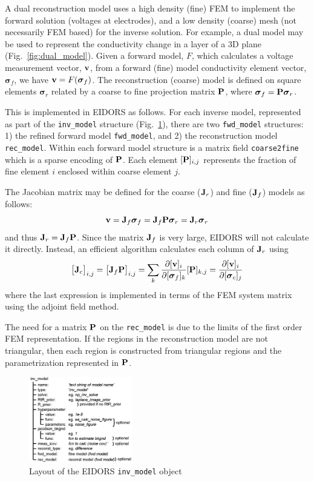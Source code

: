 \documentclass[letterpaper,twocolumn,10pt]{article}
\newcommand{\vB}{\mbox{$\bf v$}}
\newcommand{\JB}{\mbox{$\bf J$}}
\newcommand{\PB}{\mbox{$\bf P$}}
\newcommand{\sG}{\mbox{$\boldsymbol \sigma$}}
\begin{document}
A dual reconstruction model uses a high density (fine)
FEM to implement the forward solution (voltages
at electrodes), and a low density (coarse) mesh
(not necessarily FEM based) for the inverse
solution. For example, a dual model may be used to 
represent the conductivity change in a layer
of a 3D plane (Fig.~\ref{fig:dual_model}).
Given a forward model, $F$,
which calculates a voltage measurement vector, $\vB$, from
a forward (fine) model conductivity element vector, $\sG_f$, we
have $\vB = F( \sG_f )$. The reconstruction (coarse)
model is defined on square elements $\sG_r$ related by
a coarse to fine projection matrix $\PB$, where $\sG_f = \PB \sG_r$.

This is implemented in EIDORS as follows. For each
inverse model, represented as part of the {\tt inv\_model}
structure (Fig.~\ref{fig:invmdl}),
there are two {\tt fwd\_model} structures:
1) the refined forward model {\tt fwd\_model}, and
2) the reconstruction model {\tt rec\_model}. 
Within each forward model structure is a matrix field
{\tt coarse2fine} which is a sparse encoding of $\PB$.
Each element $[\PB]_{i,j}$ represents the fraction of
fine element $i$ enclosed within coarse element $j$.

The Jacobian matrix may be defined for the coarse
($\JB_r$) and fine ($\JB_f$) models as follows:
\begin{equation}
\vB = \JB_f \sG_f 
    = \JB_f \PB \sG_r
    = \JB_r     \sG_r
\end{equation}
and thus $\JB_r = \JB_f \PB$. Since the matrix
$\JB_f$ is very large, EIDORS will not calculate it
directly. Instead, an efficient algorithm calculates
each column of $\JB_r$ using
\begin{equation}
\big[ \JB_c \big]_{i,j} =
\big[ \JB_f \PB \big]_{i,j} =
\sum_k \frac{\partial [ \vB ]_i }
            {\partial [ \sG_f ]_k } [\PB]_{k,j}
= \frac{\partial [ \vB ]_i }
       {\partial [ \sG_c ]_j }
\end{equation}
where the last expression is implemented in terms
of the FEM system matrix using the adjoint field method.

The need for a matrix $\PB$ on the {\tt rec\_model} is
due to the limits of the first order FEM representation.
If the regions in the reconstruction model are not
triangular, then each region is constructed from triangular
regions and the parametrization represented in $\PB$.

\begin{figure}[tbh]
\begin{center}
 \includegraphics[width= 0.40\textwidth]{figs/inv_model.png}
\caption{ \label{fig:invmdl}
\small
Layout of the EIDORS {\tt inv\_model} object
}
\end{center}
\vspace{-0.5cm}
\end{figure}
\end{document}
